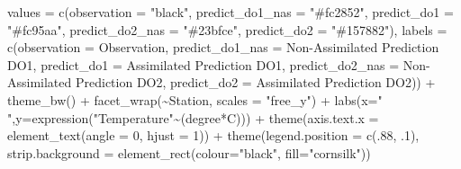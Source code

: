 \documentclass[
  letterpaper,
  DIV=11,
  numbers=noendperiod,
  abstract]{scrartcl}
\newenvironment{Shaded}{\begin{snugshade}}{\end{snugshade}}
\newcommand{\AttributeTok}[1]{\textcolor[rgb]{0.40,0.45,0.13}{#1}}
\newcommand{\DecValTok}[1]{\textcolor[rgb]{0.68,0.00,0.00}{#1}}
\newcommand{\FunctionTok}[1]{\textcolor[rgb]{0.28,0.35,0.67}{#1}}
\newcommand{\NormalTok}[1]{\textcolor[rgb]{0.00,0.23,0.31}{#1}}
\newcommand{\OtherTok}[1]{\textcolor[rgb]{0.00,0.23,0.31}{#1}}
\newcommand{\SpecialCharTok}[1]{\textcolor[rgb]{0.37,0.37,0.37}{#1}}
\newcommand{\StringTok}[1]{\textcolor[rgb]{0.13,0.47,0.30}{#1}}
\begin{document}
\begin{Shaded}
\begin{Highlighting}[]
          \AttributeTok{values =} \FunctionTok{c}\NormalTok{(}\StringTok{\textquotesingle{}observation\textquotesingle{}} \OtherTok{=} \StringTok{"black"}\NormalTok{,}
                     \StringTok{\textquotesingle{}predict\_do1\_nas\textquotesingle{}} \OtherTok{=} \StringTok{"\#fc2852"}\NormalTok{,}
                     \StringTok{\textquotesingle{}predict\_do1\textquotesingle{}} \OtherTok{=} \StringTok{"\#fc95aa"}\NormalTok{,}
                     \StringTok{\textquotesingle{}predict\_do2\_nas\textquotesingle{}} \OtherTok{=} \StringTok{"\#23bfce"}\NormalTok{,}
                     \StringTok{\textquotesingle{}predict\_do2\textquotesingle{}} \OtherTok{=} \StringTok{"\#157882"}\NormalTok{),}
          \AttributeTok{labels =} \FunctionTok{c}\NormalTok{(}\StringTok{\textquotesingle{}observation\textquotesingle{}} \OtherTok{=} \StringTok{\textquotesingle{}Observation\textquotesingle{}}\NormalTok{,}
                     \StringTok{\textquotesingle{}predict\_do1\_nas\textquotesingle{}} \OtherTok{=} \StringTok{\textquotesingle{}Non{-}Assimilated Prediction DO1\textquotesingle{}}\NormalTok{,}
                     \StringTok{\textquotesingle{}predict\_do1\textquotesingle{}} \OtherTok{=} \StringTok{\textquotesingle{}Assimilated Prediction DO1\textquotesingle{}}\NormalTok{,}
                     \StringTok{\textquotesingle{}predict\_do2\_nas\textquotesingle{}} \OtherTok{=} \StringTok{\textquotesingle{}Non{-}Assimilated Prediction DO2\textquotesingle{}}\NormalTok{,}
                     \StringTok{\textquotesingle{}predict\_do2\textquotesingle{}} \OtherTok{=} \StringTok{\textquotesingle{}Assimilated Prediction DO2\textquotesingle{}}\NormalTok{)) }\SpecialCharTok{+}
  \FunctionTok{theme\_bw}\NormalTok{() }\SpecialCharTok{+} 
  \FunctionTok{facet\_wrap}\NormalTok{(}\SpecialCharTok{\textasciitilde{}}\NormalTok{Station, }\AttributeTok{scales =} \StringTok{"free\_y"}\NormalTok{) }\SpecialCharTok{+} 
  \FunctionTok{labs}\NormalTok{(}\AttributeTok{x=}\StringTok{" "}\NormalTok{,}\AttributeTok{y=}\FunctionTok{expression}\NormalTok{(}\StringTok{"Temperature"}\SpecialCharTok{\textasciitilde{}}\NormalTok{(degree}\SpecialCharTok{*}\NormalTok{C))) }\SpecialCharTok{+} 
  \FunctionTok{theme}\NormalTok{(}\AttributeTok{axis.text.x =} \FunctionTok{element\_text}\NormalTok{(}\AttributeTok{angle =} \DecValTok{0}\NormalTok{, }\AttributeTok{hjust =} \DecValTok{1}\NormalTok{))  }\SpecialCharTok{+}
  \FunctionTok{theme}\NormalTok{(}\AttributeTok{legend.position =} \FunctionTok{c}\NormalTok{(.}\DecValTok{88}\NormalTok{, .}\DecValTok{1}\NormalTok{), }
        \AttributeTok{strip.background =} \FunctionTok{element\_rect}\NormalTok{(}\AttributeTok{colour=}\StringTok{"black"}\NormalTok{, }\AttributeTok{fill=}\StringTok{"cornsilk"}\NormalTok{))}
\end{Highlighting}
\end{Shaded}
\end{document}
